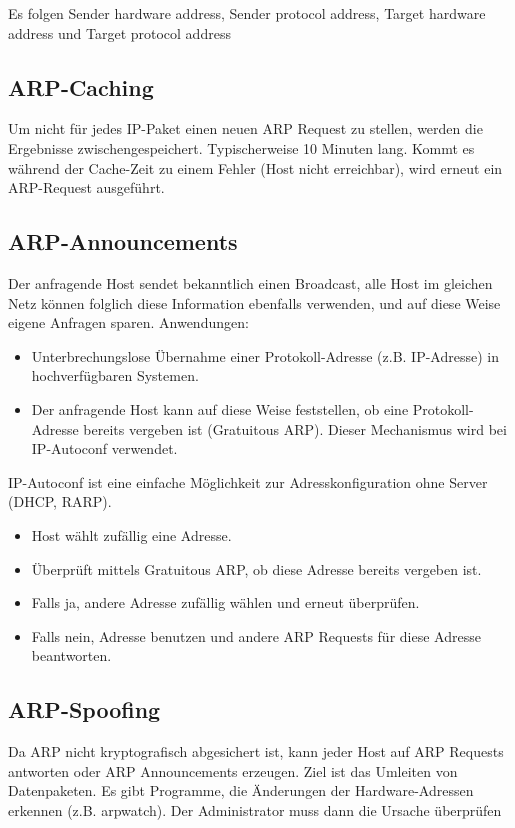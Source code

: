 \documentclass{article} %
\begin{document}
Es folgen Sender hardware address, Sender protocol address, Target hardware address und Target protocol address

\subsection{ARP-Caching}

Um nicht für jedes IP-Paket einen neuen ARP Request zu stellen, werden die Ergebnisse zwischengespeichert.
Typischerweise 10 Minuten lang.
Kommt es während der Cache-Zeit zu einem Fehler (Host nicht erreichbar), wird erneut ein ARP-Request ausgeführt.

\subsection{ARP-Announcements}

Der anfragende Host sendet bekanntlich einen Broadcast, alle Host im gleichen Netz können folglich diese Information ebenfalls verwenden, und auf diese Weise eigene Anfragen sparen.
Anwendungen:
\begin{itemize}
\item Unterbrechungslose Übernahme einer Protokoll-Adresse (z.B. IP-Adresse) in hochverfügbaren Systemen.
\item Der anfragende Host kann auf diese Weise feststellen, ob eine Protokoll-Adresse bereits vergeben ist (Gratuitous ARP). Dieser Mechanismus wird bei IP-Autoconf verwendet.
\end{itemize}

IP-Autoconf \cite{rfc3927} ist eine einfache Möglichkeit zur Adresskonfiguration ohne Server (DHCP, RARP).

\begin{itemize}
	\item Host wählt zufällig eine Adresse.
	\item Überprüft mittels Gratuitous ARP, ob diese Adresse bereits vergeben ist.
	\item Falls ja, andere Adresse zufällig wählen und erneut überprüfen.
	\item Falls nein, Adresse benutzen und andere ARP Requests für diese Adresse beantworten.
\end{itemize}

\subsection{ARP-Spoofing}

Da ARP nicht kryptografisch abgesichert ist, kann jeder Host auf ARP Requests antworten oder ARP Announcements erzeugen.
Ziel ist das Umleiten von Datenpaketen.
Es gibt Programme, die Änderungen der Hardware-Adressen erkennen (z.B. arpwatch).
Der Administrator muss dann die Ursache überprüfen
\end{document}
